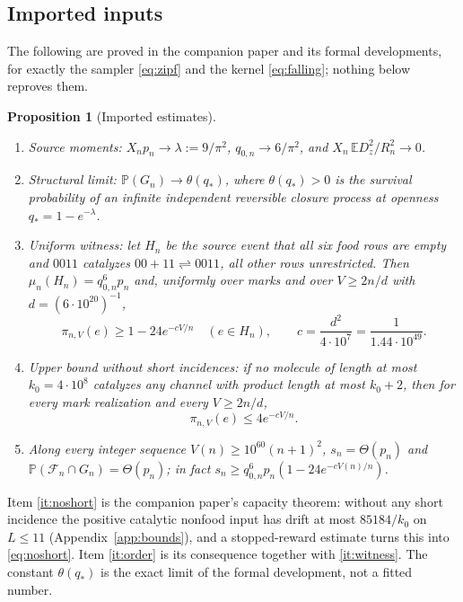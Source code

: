 \documentclass[11pt,letterpaper]{article}
\theoremstyle{plain}
\newtheorem{proposition}[theorem]{Proposition}
\theoremstyle{definition}
\theoremstyle{remark}
\numberwithin{equation}{section}
\newcommand{\PP}{\mathbb P}
\newcommand{\EE}{\mathbb E}
\newcommand{\cF}{\mathcal F}
\newcommand{\thetaq}{\theta(q_*)}
\begin{document}
\subsection{Imported inputs}\label{sec:inputs}
The following are proved in the companion paper \cite{companion2026} and its formal developments, for exactly the sampler \eqref{eq:zipf} and the kernel \eqref{eq:falling}; nothing below reproves them.
\begin{proposition}[Imported estimates]\label{prop:imported}\leavevmode
\begin{enumerate}[label=\textup{(\roman*)}]
\item\label{it:moments} Source moments: $X_np_n\to\lambda:=9/\pi^2$, $q_{0,n}\to6/\pi^2$, and $X_n\,\EE D_z^2/R_n^2\to0$.
\item\label{it:theta} Structural limit: $\PP(G_n)\to\thetaq$, where $\thetaq>0$ is the survival probability of an infinite independent reversible closure process at openness $q_*=1-e^{-\lambda}$.
\item\label{it:witness} Uniform witness: let $H_n$ be the source event that all six food rows are empty and $0011$ catalyzes $00+11\rightleftharpoons0011$, all other rows unrestricted. Then $\mu_n(H_n)=q_{0,n}^6p_n$ and, uniformly over marks and over $V\ge2n/d$ with $d=(6\cdot10^{20})^{-1}$,
\begin{equation}\label{eq:witness}
 \pi_{n,V}(e)\ge1-24e^{-cV/n}\quad(e\in H_n),\qquad c=\frac{d^2}{4\cdot10^7}=\frac1{1.44\cdot10^{49}} .
\end{equation}
\item\label{it:noshort} Upper bound without short incidences: if no molecule of length at most $k_0=4\cdot10^8$ catalyzes any channel with product length at most $k_0+2$, then for every mark realization and every $V\ge2n/d$,
\begin{equation}\label{eq:noshort}
 \pi_{n,V}(e)\le4e^{-cV/n} .
\end{equation}
\item\label{it:order} Along every integer sequence $V(n)\ge10^{60}(n+1)^2$, $s_n=\Theta(p_n)$ and $\PP(\cF_n\cap G_n)=\Theta(p_n)$; in fact $s_n\ge q_{0,n}^6p_n(1-24e^{-cV(n)/n})$.
\end{enumerate}
\end{proposition}
Item \ref{it:noshort} is the companion paper's capacity theorem: without any short incidence the positive catalytic nonfood input has drift at most $85184/k_0$ on $L\le11$ (Appendix~\ref{app:bounds}), and a stopped-reward estimate turns this into \eqref{eq:noshort}. Item \ref{it:order} is its consequence together with \ref{it:witness}. The constant $\thetaq$ is the exact limit of the formal development, not a fitted number.
\end{document}
